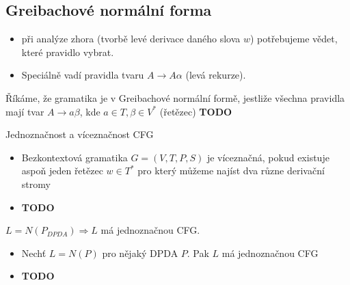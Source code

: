 \documentclass[../main.tex]{subfiles}
\begin{document}
\subsection{Greibachové normální forma}
\begin{itemize}
    \item při analýze zhora (tvorbě levé derivace daného slova $w$) potřebujeme vědet, které pravidlo vybrat.
    \item Speciálně vadí pravidla tvaru $A \rightarrow A\alpha$ (levá rekurze).
\end{itemize}
\begin{definition}
    Říkáme, že gramatika je v Greibachové normální formě, jestliže všechna pravidla mají tvar $A \rightarrow a\beta$, kde 
    $a \in T, \beta \in V^*$ (řetězec) \textbf{TODO}
\end{definition}
\begin{definition}
    Jednoznačnost a víceznačnost CFG\\
    \begin{itemize}
        \item Bezkontextová gramatika $G = (V,T,P,S)$ je víceznačná, pokud existuje aspoň jeden řetězec $w\in T^*$ pro který můžeme najíst dva různe derivační stromy
        \item \textbf{TODO}
    \end{itemize} 
\end{definition}
\begin{theorem}
    $L = N(P_{DPDA}) \Rightarrow L$ má jednoznačnou CFG.\\
    \begin{itemize}
        \item Nechť $L=N(P)$ pro nějaký DPDA $P$. Pak $L$ má jednoznačnou CFG
        \item \textbf{TODO}
    \end{itemize}
\end{theorem}
\end{document}
